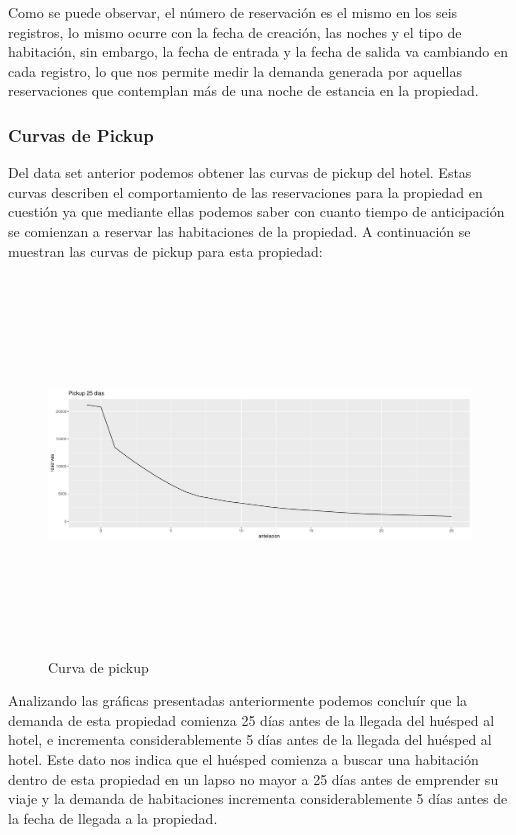 Como se puede observar, el número de reservación es el mismo en los seis registros, lo mismo ocurre con la fecha de creación, las noches y el tipo de habitación, sin embargo, la fecha de entrada y la fecha de salida va cambiando en cada registro, lo que nos permite medir la demanda generada por aquellas reservaciones que contemplan más de una noche de estancia en la propiedad. 

\subsubsection*{Curvas de Pickup}

Del data set anterior podemos obtener las curvas de pickup del hotel. Estas curvas describen el comportamiento de las reservaciones para la propiedad en cuestión ya que mediante ellas podemos saber con cuanto tiempo de anticipación se comienzan a reservar las habitaciones de la propiedad. A continuación se muestran las curvas de pickup para esta propiedad:

\begin{figure}[H]
  \centering
      \includegraphics[width=\maxwidth,height=10cm]{figures/pickupzoom-1}  
  \caption{Curva de pickup}
\end{figure}

Analizando las gráficas presentadas anteriormente podemos concluír que la demanda de esta propiedad comienza 25 días antes de la llegada del huésped al hotel, e incrementa considerablemente 5 días antes de la llegada del huésped al hotel. Este dato nos indica que el huésped comienza a buscar una habitación dentro de esta propiedad en un lapso no mayor a 25 días antes de emprender su viaje y la demanda de habitaciones incrementa considerablemente 5 días antes de la fecha de llegada a la propiedad.

